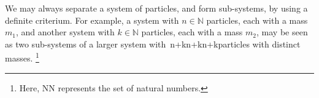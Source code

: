 We may always separate a system of particles, and form sub-systems, by using a definite criterium. For example, a system with $n\in\mathbb{N}$ particles, each with a mass $m_1$, and another system with $k\in\mathbb{N}$ particles, each with a mass $m_2$, may be seen as two sub-systems of a larger system with n+kn+kn+k​ particles with distinct masses. \footnote{Here, NN​ represents the set of natural numbers.}